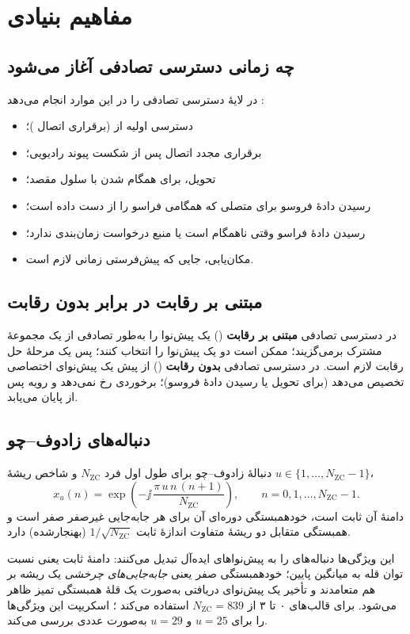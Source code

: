 \documentclass[11pt,a4paper]{article}
\begin{document}
\section{مفاهیم بنیادی}

\subsection{چه زمانی دسترسی تصادفی آغاز می‌شود}
در  لایهٔ  دسترسی تصادفی را در این موارد انجام می‌دهد \cite{ts36321}:
\begin{itemize}
  \item دسترسی اولیه از  (برقراری اتصال )؛
  \item برقراری مجدد اتصال  پس از شکست پیوند رادیویی؛
  \item تحویل، برای همگام شدن با سلول مقصد؛
  \item رسیدن دادهٔ فروسو برای  متصلی که همگامی فراسو را از دست داده است؛
  \item رسیدن دادهٔ فراسو وقتی  ناهمگام است یا منبع درخواست زمان‌بندی ندارد؛
  \item مکان‌یابی، جایی که پیش‌فرستی زمانی لازم است.
\end{itemize}

\subsection{مبتنی بر رقابت در برابر بدون رقابت}
در دسترسی تصادفی \textbf{مبتنی بر رقابت} ()  یک پیش‌نوا را به‌طور تصادفی از یک مجموعهٔ
مشترک برمی‌گزیند؛ ممکن است دو  یک پیش‌نوا را انتخاب کنند؛ پس یک مرحلهٔ حل رقابت لازم است. در دسترسی
تصادفی \textbf{بدون رقابت} ()  از پیش یک پیش‌نوای اختصاصی تخصیص می‌دهد (برای تحویل یا رسیدن
دادهٔ فروسو)؛ برخوردی رخ نمی‌دهد و رویه پس از  پایان می‌یابد.

\subsection{دنباله‌های زادوف--چو}
\begin{definitionbox}{دنبالهٔ زادوف--چو}
برای طول اول فرد $N_{\mathrm{ZC}}$ و شاخص ریشهٔ $u\in\{1,\dots,N_{\mathrm{ZC}}-1\}$،
\begin{equation}\label{eq:zc}
  x_u(n) = \exp\!\left(-\jj\,\frac{\pi\,u\,n\,(n+1)}{N_{\mathrm{ZC}}}\right), \qquad n = 0,1,\dots,N_{\mathrm{ZC}}-1 .
\end{equation}
دامنهٔ آن ثابت است، خودهمبستگی دوره‌ای آن برای هر جابه‌جایی غیرصفر صفر است و همبستگی متقابل دو ریشهٔ متفاوت
اندازهٔ ثابت $1/\sqrt{N_{\mathrm{ZC}}}$ (بهنجارشده) دارد.
\end{definitionbox}
این ویژگی‌ها دنباله‌های  را به پیش‌نواهای ایده‌آل تبدیل می‌کنند: دامنهٔ ثابت یعنی نسبت توان قله به
میانگین پایین؛ خودهمبستگی صفر یعنی \emph{جابه‌جایی‌های چرخشی} یک ریشه بر هم متعامدند و تأخیر یک پیش‌نوای
دریافتی به‌صورت یک قلهٔ همبستگی تمیز ظاهر می‌شود.  برای قالب‌های ۰ تا ۳ از $N_{\mathrm{ZC}} = 839$ استفاده
می‌کند \cite{ts36211}؛ اسکریپت  این ویژگی‌ها را برای $u=25$ و $u=29$ به‌صورت
عددی بررسی می‌کند.
\end{document}
